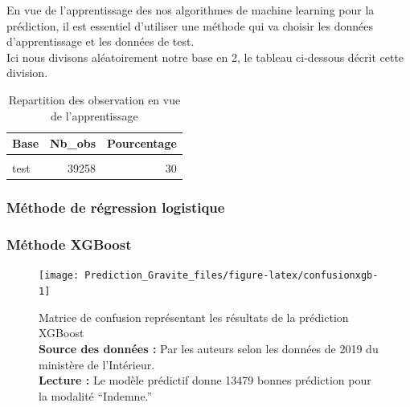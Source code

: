 \documentclass[french,]{tp}
\begin{document}
En vue de l'apprentissage des nos algorithmes de machine learning pour la prédiction, il est essentiel d'utiliser une méthode qui va choisir les données d'apprentissage et les données de test.\\
Ici nous divisons aléatoirement notre base en 2, le tableau ci-dessous décrit cette division.



\begin{table}[H]

\caption{\label{tab:tabletraintest}Repartition des observation en vue de l'apprentissage}
\centering
\begin{tabular}[t]{lrr}
\toprule
\textbf{Base} & \textbf{Nb\_obs} & \textbf{Pourcentage}\\
\midrule
\cellcolor{gray!6}{train} & \cellcolor{gray!6}{91599} & \cellcolor{gray!6}{70}\\
test & 39258 & 30\\
\bottomrule
\end{tabular}
\end{table}

\newpage

\hypertarget{muxe9thode-de-ruxe9gression-logistique}{%
\subsubsection{Méthode de régression logistique}\label{muxe9thode-de-ruxe9gression-logistique}}

\newpage

\hypertarget{muxe9thode-xgboost}{%
\subsubsection{Méthode XGBoost}\label{muxe9thode-xgboost}}

\begin{figure}[ht!]

{\centering \texttt{[image: Prediction\_Gravite\_files/figure-latex/confusionxgb-1]} 

}

\caption{Matrice de confusion représentant les résultats de la prédiction XGBoost\\
\textbf{Source des données :} Par les auteurs selon les données de 2019 du ministère de l'Intérieur.\\
\textbf{Lecture :} Le modèle prédictif donne 13479 bonnes prédiction pour la modalité ``Indemne.''}\label{fig:confusionxgb}
\end{figure}
\end{document}
